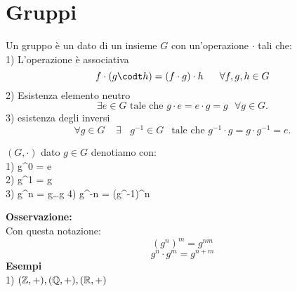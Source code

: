\documentclass[12px]{article}
\begin{document}
\section{Gruppi}
\begin{defi}[Gruppo]
	Un gruppo è un dato di un insieme $G$ con un'operazione $\cdot$ tali che:\\
	1) L'operazione è associativa\\
	\[f \cdot (g\codt h) = (f\cdot g)\cdot h \ \ \ \ \ \forall f, g, h\in G\]
	2) Esistenza elemento neutro
	\[
		\exists e\in G \text{    tale che     } g\cdot e = e\cdot g = g \ \ \ \forall g\in G
	.\] 
	3) esistenza degli inversi
	\[
		\forall g\in G \ \ \ \ \ \exists \ \ \ \ g^{-1}\in G \ \ \text{ tale che    } g^{-1}\cdot g = g\cdot g^{-1} = e
	.\] 
\end{defi}
\begin{nome}[notazione]
	$(G,\cdot)$
	dato  $g\in G$ denotiamo con: \\
	1) g^0 = e\\
	2) g^1 = g\\
	3) g^n = g\cdot\ldots\cdot g
	4) g^{-n} = (g^{-1})^n

\end{nome}
\textbf{Osservazione:}\\
Con questa notazione:\\
\[
	(g^n)^m = g^{nm}
\] 
\[
	g^n \cdot g^m = g^{n + m}
\] 
\textbf{Esempi}\\
1) $(\mathbb Z, + ), (\mathbb Q, + ), (\mathbb{R}, +)$\\
\end{document}
